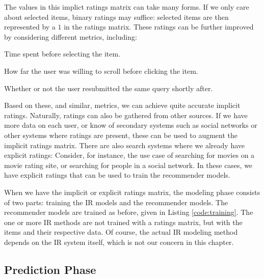 The values in this implict ratings matrix can take many forms.
If we only care about selected items, binary ratings may suffice:
selected items are then represented by a $1$ in the ratings matrix.
These ratings can be further improved by considering different metrics, including:

\begin{itemize*}
  \item Time spent before selecting the item.
  \item How far the user was willing to scroll before clicking the item.
  \item Whether or not the user resubmitted the same query shortly after.
\end{itemize*}

Based on these, and similar, metrics, we can achieve quite accurate implicit ratings.
Naturally, ratings can also be gathered from other sources.
If we have more data on each user, or know of secondary systems such as social networks
or other systems where ratings are present, these can be used to augment the implicit ratings matrix.
There are also search systems where we already have explicit ratings:
Consider, for instance, the use case of searching for movies on a movie rating site,
or searching for people in a social network.
In these cases, we have explicit ratings that can be used to train the recommender models.

When we have the implicit or explicit ratings matrix, the modeling phase
consists of two parts: training the IR models and the recommender models.
The recommender models are trained as before, given in Listing \ref{code:training}.
The one or more IR methods are not trained with a ratings matrix,
but with the items and their respective data.
Of course, the actual IR modeling method depends on the IR system itself,
which is not our concern in this chapter.


\subsection{Prediction Phase}

